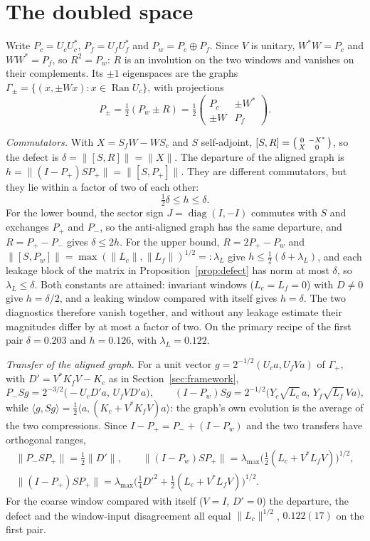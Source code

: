 \documentclass[11pt]{article}
\newcommand{\lmax}{\lambda_{\max}}
\begin{document}
\section{The doubled space}\label{app:doubled}

Write $P_c=U_cU_c^*$, $P_f=U_fU_f^*$ and $P_w=P_c\oplus P_f$. Since $V$ is unitary, $W^*W=P_c$ and
$WW^*=P_f$, so $R^2=P_w$: $R$ is an involution on the two windows and vanishes on their complements. Its
$\pm1$ eigenspaces are the graphs $\Gamma_\pm=\{(x,\pm Wx):x\in\operatorname{Ran}U_c\}$, with projections
\[
 P_\pm=\tfrac12(P_w\pm R)=\tfrac12\begin{pmatrix}P_c&\pm W^*\\ \pm W&P_f\end{pmatrix}.
\]

\emph{Commutators.} With $X=S_fW-WS_c$ and $S$ self-adjoint, $[S,R]=\begin{psmallmatrix}0&-X^*\\X&0
\end{psmallmatrix}$, so the defect is $\delta=\|[S,R]\|=\|X\|$. The departure of the aligned graph is
$h=\|(I-P_+)SP_+\|=\|[S,P_+]\|$. They are different commutators, but they lie within a factor of two of
each other:
\[
 \tfrac12\delta\le h\le\delta .
\]
For the lower bound, the sector sign $J=\operatorname{diag}(I,-I)$ commutes with $S$ and exchanges $P_+$
and $P_-$, so the anti-aligned graph has the same departure, and $R=P_+-P_-$ gives $\delta\le2h$. For the
upper bound, $R=2P_+-P_w$ and $\|[S,P_w]\|=\max(\|L_c\|,\|L_f\|)^{1/2}=:\lambda_L$ give
$h\le\tfrac12(\delta+\lambda_L)$, and each leakage block of the matrix in Proposition~\ref{prop:defect} has
norm at most $\delta$, so $\lambda_L\le\delta$. Both constants are attained: invariant windows
($L_c=L_f=0$) with $D\ne0$ give $h=\delta/2$, and a leaking window compared with itself gives $h=\delta$.
The two diagnostics therefore vanish together, and without any leakage estimate their magnitudes differ
by at most a factor of two. On the primary recipe of the first pair $\delta=0.203$ and $h=0.126$, with
$\lambda_L=0.122$.

\emph{Transfer of the aligned graph.} For a unit vector $g=2^{-1/2}(U_ca,U_fVa)$ of $\Gamma_+$, with
$D'=V^*K_fV-K_c$ as in Section~\ref{sec:framework},
\[
 P_-Sg=2^{-3/2}\bigl(-U_cD'a,\,U_fVD'a\bigr),\qquad
 (I-P_w)Sg=2^{-1/2}\bigl(Y_c\sqrt{L_c}\,a,\,Y_f\sqrt{L_f}\,Va\bigr),
\]
while $\langle g,Sg\rangle=\tfrac12\langle a,(K_c+V^*K_fV)a\rangle$: the graph's own evolution is the
average of the two compressions. Since $I-P_+=P_-+(I-P_w)$ and the two transfers have orthogonal ranges,
\begin{gather*}
 \|P_-SP_+\|=\tfrac12\|D'\|,\qquad \|(I-P_w)SP_+\|=\lmax\bigl(\tfrac12(L_c+V^*L_fV)\bigr)^{1/2},\\
 \|(I-P_+)SP_+\|=\lmax\bigl(\tfrac14D'^2+\tfrac12(L_c+V^*L_fV)\bigr)^{1/2}.
\end{gather*}
For the coarse window compared with itself ($V=I$, $D'=0$) the departure, the defect and the
window-input disagreement all equal $\|L_c\|^{1/2}$, $0.122(17)$ on the first pair.
\end{document}
